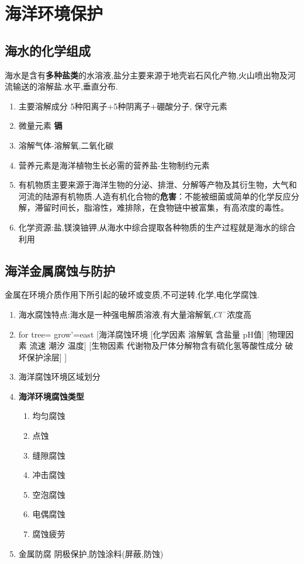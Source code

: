 \section{海洋环境保护}
	\subsection{海水的化学组成}
		海水是含有\textbf{多种盐类}的水溶液,盐分主要来源于地壳岩石风化产物,火山喷出物及河流输送的溶解盐.水平,垂直分布.
		\begin{enumerate}[1)]
			\item 主要溶解成分 5种阳离子+5种阴离子+硼酸分子, 保守元素
			\item 微量元素 \textbf{镉}
			\item 溶解气体-溶解氧,二氧化碳
			\item 营养元素是海洋植物生长必需的营养盐-生物制约元素
			\item 有机物质主要来源于海洋生物的分泌、排泄、分解等产物及其衍生物，大气和河流的陆源有机物质.人造有机化合物的\textbf{危害}：不能被细菌或简单的化学反应分解，滞留时间长，脂溶性，难排除，在食物链中被富集，有高浓度的毒性。
			\item 化学资源:盐,镁溴铀钾,从海水中综合提取各种物质的生产过程就是海水的综合利用	
		\end{enumerate}
	
	\subsection{海洋金属腐蚀与防护}
		金属在环境介质作用下所引起的破坏或变质,不可逆转.化学,电化学腐蚀.
		\begin{enumerate}
			\item 海水腐蚀特点:海水是一种强电解质溶液,有大量溶解氧,$Cl^-$浓度高
			\item \begin{forest}
					for tree= {grow'=east} 
						[海洋腐蚀环境
							[化学因素{} 溶解氧 含盐量 pH值]
							[物理因素{} 流速 潮汐 温度]
							[生物因素{} 代谢物及尸体分解物含有硫化氢等酸性成分 破坏保护涂层]
							]
				\end{forest}
			\item 海洋腐蚀环境区域划分
			\item \textbf{海洋环境腐蚀类型}
				\begin{enumerate}
					\item 均匀腐蚀
					\item 点蚀
					\item 缝隙腐蚀
					\item 冲击腐蚀
					\item 空泡腐蚀
					\item 电偶腐蚀
					\item 腐蚀疲劳
				\end{enumerate}
			\item 金属防腐
				阴极保护,防蚀涂料(屏蔽,防蚀)	
			
		\end{enumerate}
	
